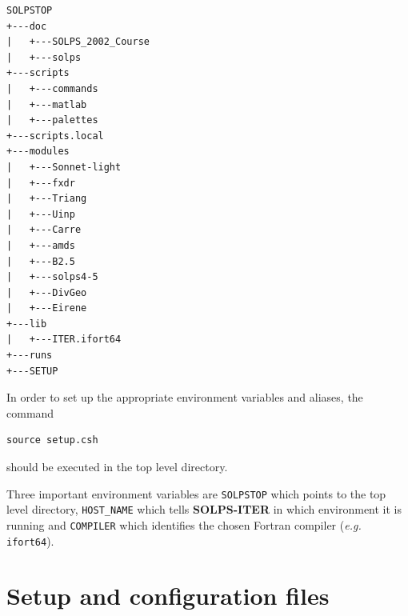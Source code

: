 \documentclass[a4paper,10pt]{report}
\newcommand\SOLPSITER{{\bf SOLPS-ITER} }
\begin{document}

\begin{verbatim}
SOLPSTOP
+---doc
|   +---SOLPS_2002_Course
|   +---solps
+---scripts
|   +---commands
|   +---matlab
|   +---palettes
+---scripts.local
+---modules
|   +---Sonnet-light
|   +---fxdr
|   +---Triang
|   +---Uinp
|   +---Carre
|   +---amds
|   +---B2.5
|   +---solps4-5
|   +---DivGeo
|   +---Eirene
+---lib
|   +---ITER.ifort64
+---runs
+---SETUP
\end{verbatim}

In order to set up the appropriate environment variables and aliases, the command
\begin{verbatim}
source setup.csh
\end{verbatim}
should be executed in the top level directory.

Three important environment variables are {\tt SOLPSTOP} which points
to the top level directory, {\tt HOST\_NAME} which tells \SOLPSITER in
which environment it is running and {\tt COMPILER} which identifies the
chosen Fortran compiler ({\it e.g.} {\tt ifort64}).

\section{Setup and configuration files}
\label{sec:setup}
\end{document}
